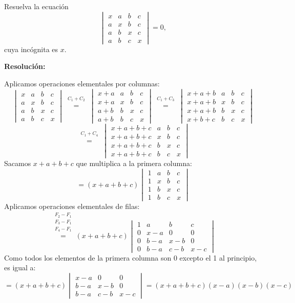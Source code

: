 \documentclass[a4paper,12pt]{article}
\begin{document}
\begin{ejercicio}[title=Ejercicio 35]
Resuelva la ecuación
\[
\begin{vmatrix}
x & a & b & c\\
a & x & b & c\\
a & b & x & c\\
a & b & c & x
\end{vmatrix}
= 0,
\]
cuya incógnita es $x$.

\tcblower
\textbf{Resolución:}

Aplicamos operaciones elementales por columnas:
\[
\begin{vmatrix}
x & a & b & c\\
a & x & b & c\\
a & b & x & c\\
a & b & c & x
\end{vmatrix}
\overset{\substack{C_1+C_2\\{}}}{=}
\begin{vmatrix}
x+a & a & b & c\\
x+a & x & b & c\\
a+b & b & x & c\\
a+b & b & c & x
\end{vmatrix}
\overset{\substack{C_1+C_3\\{}}}{=}
\begin{vmatrix}
x+a+b & a & b & c\\
x+a+b & x & b & c\\
x+a+b & b & x & c\\
x+b+c & b & c & x
\end{vmatrix}
\]
\[
\overset{\substack{C_1+C_4\\{}}}{=}
\begin{vmatrix}
x+a+b+c & a & b & c\\
x+a+b+c & x & b & c\\
x+a+b+c & b & x & c\\
x+a+b+c & b & c & x
\end{vmatrix}
\]
Sacamos $x+a+b+c$ que multiplica a la primera columna:
\[
= (x+a+b+c)
\begin{vmatrix}
1 & a & b & c\\
1 & x & b & c\\
1 & b & x & c\\
1 & b & c & x
\end{vmatrix}
\]
Aplicamos operaciones elementales de filas:
\[
\overset{\substack{F_2-F_1\\F_3-F_1\\F_4-F_1\\{}}}{=}
(x+a+b+c)
\begin{vmatrix}
1 & a & b & c\\
0 & x-a & 0 & 0\\
0 & b-a & x-b & 0\\
0 & b-a & c-b & x-c
\end{vmatrix}
\]
Como todos los elementos de la primera columna son 0 excepto el 1 al principio, es igual a: 
\[
=
(x+a+b+c)
\begin{vmatrix}
x-a & 0 & 0\\
b-a & x-b & 0\\
b-a & c-b & x-c
\end{vmatrix}
= (x+a+b+c)(x-a)(x-b)(x-c)
\]


\end{ejercicio}
\end{document}
